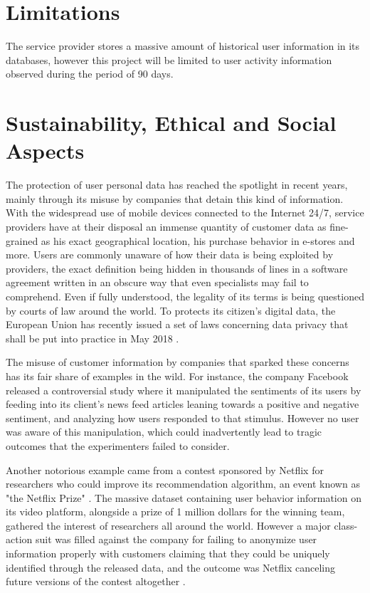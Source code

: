 \documentclass{kththesis}
\begin{document}
\section{Limitations}

The service provider stores a massive amount of historical user information in its databases, however this project will be limited to user activity information observed during the period of 90 days.

\section{Sustainability, Ethical and Social Aspects}

The protection of user personal data has reached the spotlight in recent years, mainly through its misuse by companies that detain this kind of information. With the widespread use of mobile devices connected to the Internet 24/7, service providers have at their disposal an immense quantity of customer data as fine-grained as his exact geographical location, his purchase behavior in e-stores and more. Users are commonly unaware of how their data is being exploited by providers, the exact definition being hidden in thousands of lines in a software agreement written in an obscure way that even specialists may fail to comprehend. Even if fully understood, the legality of its terms is being questioned by courts of law around the world. To protects its citizen's digital data, the European Union has recently issued a set of laws concerning data privacy that shall be put into practice in May 2018 \citep{eu2017protection}.

The misuse of customer information by companies that sparked these concerns has its fair share of examples in the wild. For instance, the company Facebook released a controversial study where it manipulated the sentiments of its users by feeding into its client's news feed articles leaning towards a positive and negative sentiment, and analyzing how users responded to that stimulus\citep{kramer2014experimental}. However no user was aware of this manipulation, which could inadvertently lead to tragic outcomes that the experimenters failed to consider. 

Another notorious example came from a contest sponsored by Netflix for researchers who could improve its recommendation algorithm, an event known as "the Netflix Prize" \citep{bennett2007netflix}. The massive dataset containing user behavior information on its video platform, alongside a prize of 1 million dollars for the winning team, gathered the interest of researchers all around the world. However a major class-action suit was filled against the company for failing to anonymize user information properly with customers claiming that they could be uniquely identified through the released data, and the outcome was Netflix canceling future versions of the contest altogether \citep{wired2010netflix}.
\end{document}

